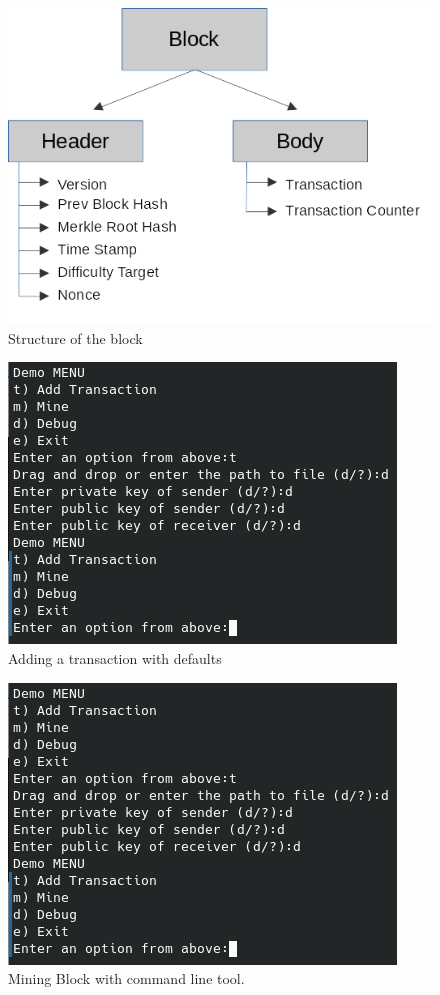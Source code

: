 \documentclass[conference]{IEEEtran}
\begin{document}
\begin{figure}[h]
	\centering
	\includegraphics[width=0.7\linewidth]{BlockStructure}
	\caption{Structure of the block}
	\label{fig:blockstructure}
\end{figure}

\begin{figure}[h]
	\centering
	\includegraphics[width=0.7\linewidth]{AddingTransaction}
	\caption{Adding a transaction with defaults}
	\label{fig:addingtransaction}
\end{figure}

\begin{figure}[h]
	\centering
	\includegraphics[width=0.7\linewidth]{Mining}
	\caption{Mining Block with command line tool.}
	\label{fig:mining}
\end{figure}
\end{document}
